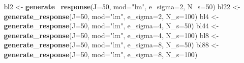 \documentclass[
]{article}
\newenvironment{Shaded}{\begin{snugshade}}{\end{snugshade}}
\newcommand{\DataTypeTok}[1]{\textcolor[rgb]{0.13,0.29,0.53}{#1}}
\newcommand{\DecValTok}[1]{\textcolor[rgb]{0.00,0.00,0.81}{#1}}
\newcommand{\KeywordTok}[1]{\textcolor[rgb]{0.13,0.29,0.53}{\textbf{#1}}}
\newcommand{\NormalTok}[1]{#1}
\newcommand{\StringTok}[1]{\textcolor[rgb]{0.31,0.60,0.02}{#1}}
\begin{document}
\begin{Shaded}
\begin{Highlighting}[]
\NormalTok{bl2 <-}\StringTok{ }\KeywordTok{generate_response}\NormalTok{(}\DataTypeTok{J=}\DecValTok{50}\NormalTok{, }\DataTypeTok{mod=}\StringTok{"lm"}\NormalTok{, }\DataTypeTok{e_sigma=}\DecValTok{2}\NormalTok{, }\DataTypeTok{N_s=}\DecValTok{50}\NormalTok{)}
\NormalTok{bl22 <-}\StringTok{ }\KeywordTok{generate_response}\NormalTok{(}\DataTypeTok{J=}\DecValTok{50}\NormalTok{, }\DataTypeTok{mod=}\StringTok{"lm"}\NormalTok{, }\DataTypeTok{e_sigma=}\DecValTok{2}\NormalTok{, }\DataTypeTok{N_s=}\DecValTok{100}\NormalTok{)}
\NormalTok{bl4 <-}\StringTok{ }\KeywordTok{generate_response}\NormalTok{(}\DataTypeTok{J=}\DecValTok{50}\NormalTok{, }\DataTypeTok{mod=}\StringTok{"lm"}\NormalTok{, }\DataTypeTok{e_sigma=}\DecValTok{4}\NormalTok{, }\DataTypeTok{N_s=}\DecValTok{50}\NormalTok{)}
\NormalTok{bl44 <-}\StringTok{ }\KeywordTok{generate_response}\NormalTok{(}\DataTypeTok{J=}\DecValTok{50}\NormalTok{, }\DataTypeTok{mod=}\StringTok{"lm"}\NormalTok{, }\DataTypeTok{e_sigma=}\DecValTok{4}\NormalTok{, }\DataTypeTok{N_s=}\DecValTok{100}\NormalTok{)}
\NormalTok{bl8 <-}\StringTok{ }\KeywordTok{generate_response}\NormalTok{(}\DataTypeTok{J=}\DecValTok{50}\NormalTok{, }\DataTypeTok{mod=}\StringTok{"lm"}\NormalTok{, }\DataTypeTok{e_sigma=}\DecValTok{8}\NormalTok{, }\DataTypeTok{N_s=}\DecValTok{50}\NormalTok{)}
\NormalTok{bl88 <-}\StringTok{ }\KeywordTok{generate_response}\NormalTok{(}\DataTypeTok{J=}\DecValTok{50}\NormalTok{, }\DataTypeTok{mod=}\StringTok{"lm"}\NormalTok{, }\DataTypeTok{e_sigma=}\DecValTok{8}\NormalTok{, }\DataTypeTok{N_s=}\DecValTok{100}\NormalTok{)}
\end{Highlighting}
\end{Shaded}
\end{document}
